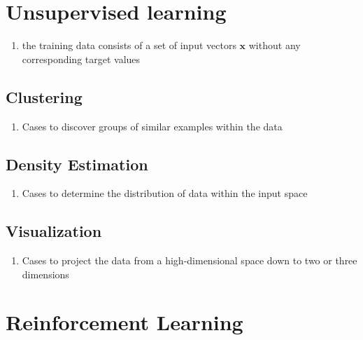 \section{Unsupervised learning}

\begin{enumerate}
    \item the training data consists of a set of input vectors $\bm{x}$ without any corresponding target values
    \hfill \cite{ml/book/Pattern-Recognition-And-Machine-Learning/Christopher-M-Bishop}
\end{enumerate}

\subsection{Clustering}

\begin{enumerate}
    \item Cases to discover groups of similar examples within the data
    \hfill \cite{ml/book/Pattern-Recognition-And-Machine-Learning/Christopher-M-Bishop}
\end{enumerate}


\subsection{Density Estimation}

\begin{enumerate}
    \item Cases to determine the distribution of data within the input space
    \hfill \cite{ml/book/Pattern-Recognition-And-Machine-Learning/Christopher-M-Bishop}
\end{enumerate}


\subsection{Visualization}

\begin{enumerate}
    \item Cases to project the data from a high-dimensional space down to two or three dimensions 
    \hfill \cite{ml/book/Pattern-Recognition-And-Machine-Learning/Christopher-M-Bishop}
\end{enumerate}


\section{Reinforcement Learning}

